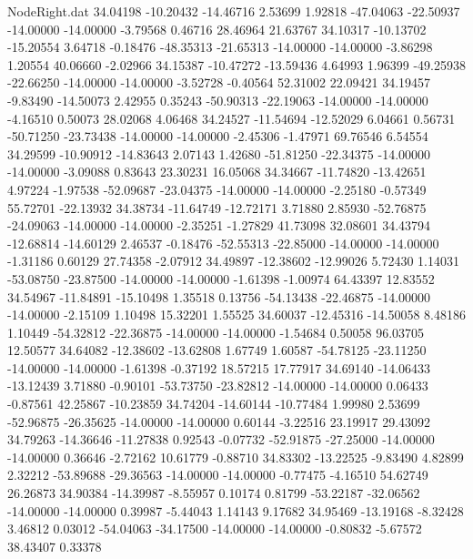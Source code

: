 \begin{filecontents}{NodeRight.dat}
  34.04198  -10.20432  -14.46716     2.53699    1.92818  -47.04063  -22.50937  -14.00000  -14.00000   -3.79568    0.46716   28.46964   21.63767
  34.10317  -10.13702  -15.20554     3.64718   -0.18476  -48.35313  -21.65313  -14.00000  -14.00000   -3.86298    1.20554   40.06660   -2.02966
  34.15387  -10.47272  -13.59436     4.64993    1.96399  -49.25938  -22.66250  -14.00000  -14.00000   -3.52728   -0.40564   52.31002   22.09421
  34.19457   -9.83490  -14.50073     2.42955    0.35243  -50.90313  -22.19063  -14.00000  -14.00000   -4.16510    0.50073   28.02068    4.06468
  34.24527  -11.54694  -12.52029     6.04661    0.56731  -50.71250  -23.73438  -14.00000  -14.00000   -2.45306   -1.47971   69.76546    6.54554
  34.29599  -10.90912  -14.83643     2.07143    1.42680  -51.81250  -22.34375  -14.00000  -14.00000   -3.09088    0.83643   23.30231   16.05068
  34.34667  -11.74820  -13.42651     4.97224   -1.97538  -52.09687  -23.04375  -14.00000  -14.00000   -2.25180   -0.57349   55.72701  -22.13932
  34.38734  -11.64749  -12.72171     3.71880    2.85930  -52.76875  -24.09063  -14.00000  -14.00000   -2.35251   -1.27829   41.73098   32.08601
  34.43794  -12.68814  -14.60129     2.46537   -0.18476  -52.55313  -22.85000  -14.00000  -14.00000   -1.31186    0.60129   27.74358   -2.07912
  34.49897  -12.38602  -12.99026     5.72430    1.14031  -53.08750  -23.87500  -14.00000  -14.00000   -1.61398   -1.00974   64.43397   12.83552
  34.54967  -11.84891  -15.10498     1.35518    0.13756  -54.13438  -22.46875  -14.00000  -14.00000   -2.15109    1.10498   15.32201    1.55525
  34.60037  -12.45316  -14.50058     8.48186    1.10449  -54.32812  -22.36875  -14.00000  -14.00000   -1.54684    0.50058   96.03705   12.50577
  34.64082  -12.38602  -13.62808     1.67749    1.60587  -54.78125  -23.11250  -14.00000  -14.00000   -1.61398   -0.37192   18.57215   17.77917
  34.69140  -14.06433  -13.12439     3.71880   -0.90101  -53.73750  -23.82812  -14.00000  -14.00000    0.06433   -0.87561   42.25867  -10.23859
  34.74204  -14.60144  -10.77484     1.99980    2.53699  -52.96875  -26.35625  -14.00000  -14.00000    0.60144   -3.22516   23.19917   29.43092
  34.79263  -14.36646  -11.27838     0.92543   -0.07732  -52.91875  -27.25000  -14.00000  -14.00000    0.36646   -2.72162   10.61779   -0.88710
  34.83302  -13.22525   -9.83490     4.82899    2.32212  -53.89688  -29.36563  -14.00000  -14.00000   -0.77475   -4.16510   54.62749   26.26873
  34.90384  -14.39987   -8.55957     0.10174    0.81799  -53.22187  -32.06562  -14.00000  -14.00000    0.39987   -5.44043    1.14143    9.17682
  34.95469  -13.19168   -8.32428     3.46812    0.03012  -54.04063  -34.17500  -14.00000  -14.00000   -0.80832   -5.67572   38.43407    0.33378

\end{filecontents}
